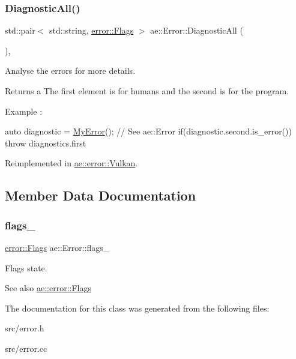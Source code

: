 \subsubsection{\texorpdfstring{Diagnostic\+All()}{DiagnosticAll()}}
{\footnotesize\ttfamily std\+::pair$<$ std\+::string, \hyperlink{structae_1_1error_1_1_flags}{error\+::\+Flags} $>$ ae\+::\+Error\+::\+Diagnostic\+All (\begin{DoxyParamCaption}{ }\end{DoxyParamCaption})\hspace{0.3cm}{\ttfamily [virtual]}, {\ttfamily [noexcept]}}



Analyse the errors for more details. 

\begin{DoxyReturn}{Returns}
a The first element is for humans and the second is for the program.
\end{DoxyReturn}
Example \+:


\begin{DoxyCode}
\textcolor{keyword}{auto} diagnostic = \hyperlink{class_my_error}{MyError}(); \textcolor{comment}{// See ae::Error}
\textcolor{keywordflow}{if}(diagnostic.second.is\_error())
\textcolor{keywordflow}{throw} diagnostics.first
\end{DoxyCode}
 

Reimplemented in \hyperlink{classae_1_1error_1_1_vulkan_a1446494fd8ab1b5fc4b9ca8c27b37e8a}{ae\+::error\+::\+Vulkan}.



\subsection{Member Data Documentation}
\hypertarget{classae_1_1_error_a323912fc2d0f697f2513d0c990478073}{}\label{classae_1_1_error_a323912fc2d0f697f2513d0c990478073} 
\subsubsection{\texorpdfstring{flags\+\_\+}{flags\_}}
{\footnotesize\ttfamily \hyperlink{structae_1_1error_1_1_flags}{error\+::\+Flags} ae\+::\+Error\+::flags\+\_\+\hspace{0.3cm}{\ttfamily [protected]}}



Flags state. 

\begin{DoxySeeAlso}{See also}
\hyperlink{structae_1_1error_1_1_flags}{ae\+::error\+::\+Flags} 
\end{DoxySeeAlso}


The documentation for this class was generated from the following files\+:\begin{DoxyCompactItemize}
\item 
src/error.\+h\item 
src/error.\+cc\end{DoxyCompactItemize}
